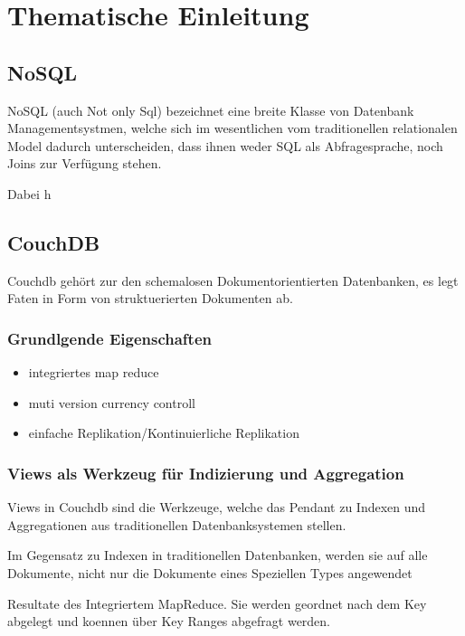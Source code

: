 \chapter{Thematische Einleitung}

\section{NoSQL}

NoSQL (auch Not only Sql) bezeichnet eine breite Klasse
von Datenbank Managementsystmen, welche sich im wesentlichen
vom traditionellen relationalen Model dadurch unterscheiden,
dass ihnen weder SQL als Abfragesprache, noch Joins zur Verfügung stehen.

Dabei h

\section{CouchDB}

Couchdb gehört zur den schemalosen Dokumentorientierten Datenbanken,
es legt Faten in Form von struktuerierten Dokumenten ab.

\subsection{Grundlgende Eigenschaften}

\begin{itemize}
\item integriertes map reduce
\item muti version currency controll
\item einfache Replikation/Kontinuierliche Replikation


\end{itemize}


\subsection{Views als Werkzeug für Indizierung und Aggregation}

Views in Couchdb sind die Werkzeuge,
welche das Pendant zu Indexen und Aggregationen
aus traditionellen Datenbanksystemen stellen.

Im Gegensatz zu Indexen in traditionellen Datenbanken, werden sie auf alle Dokumente,
nicht nur die Dokumente eines Speziellen Types angewendet


Resultate des Integriertem MapReduce.
Sie werden geordnet nach dem Key abgelegt und koennen über Key Ranges abgefragt werden.


